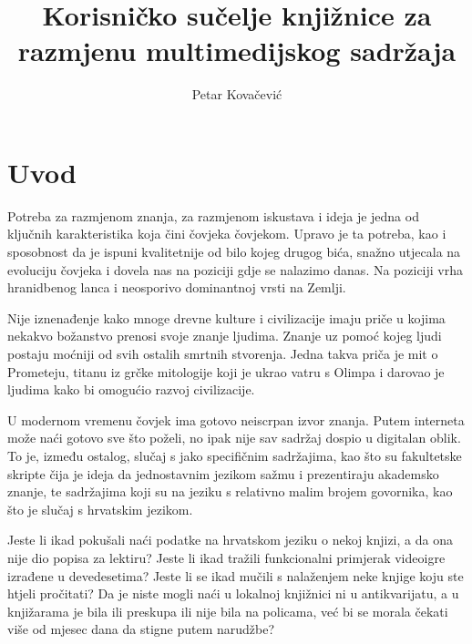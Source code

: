 \documentclass[times, utf8, zavrsni, numeric]{fer}
\newcommand{\razmakp}{\vspace{18pt}}
\begin{document}

\title{Korisničko sučelje knjižnice za razmjenu multimedijskog sadržaja}

\author{Petar Kovačević}

\maketitle



\zahvala{}


\tableofcontents



\chapter{Uvod}

Potreba za razmjenom znanja, za razmjenom iskustava i ideja je jedna od ključnih karakteristika koja čini čovjeka čovjekom.
Upravo je ta potreba, kao i sposobnost da je ispuni kvalitetnije od bilo kojeg drugog bića, snažno utjecala na evoluciju čovjeka i dovela nas na poziciji gdje se nalazimo danas.
Na poziciji vrha hranidbenog lanca i neosporivo dominantnoj vrsti na Zemlji.

Nije iznenađenje kako mnoge drevne kulture i civilizacije imaju priče u kojima nekakvo božanstvo prenosi svoje znanje ljudima.
Znanje uz pomoć kojeg ljudi postaju moćniji od svih ostalih smrtnih stvorenja.
Jedna takva priča je mit o Prometeju, titanu iz grčke mitologije koji je ukrao vatru s Olimpa i darovao je ljudima kako bi omogućio razvoj civilizacije.

\razmakp

U modernom vremenu čovjek ima gotovo neiscrpan izvor znanja.
Putem interneta može naći gotovo sve što poželi, no ipak nije sav sadržaj dospio u digitalan oblik.
To je, između ostalog, slučaj s jako specifičnim sadržajima, kao što su fakultetske skripte čija je ideja da jednostavnim jezikom sažmu i prezentiraju akademsko znanje, te sadržajima koji su na jeziku s relativno malim brojem govornika, kao što je slučaj s hrvatskim jezikom.

Jeste li ikad pokušali naći podatke na hrvatskom jeziku o nekoj knjizi, a da ona nije dio popisa za lektiru?
Jeste li ikad tražili funkcionalni primjerak videoigre izrađene u devedesetima?
Jeste li se ikad mučili s nalaženjem neke knjige koju ste htjeli pročitati?
Da je niste mogli naći u lokalnoj knjižnici ni u antikvarijatu, a u knjižarama je bila ili preskupa ili nije bila na policama, već bi se morala čekati više od mjesec dana da stigne putem narudžbe?
\end{document}
